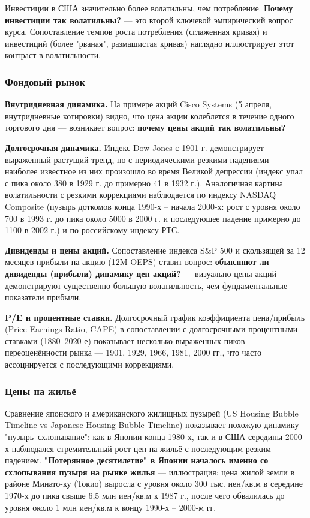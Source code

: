 \documentclass[10pt,a4paper]{article}
\begin{document}
Инвестиции в США значительно более волатильны, чем потребление. \textbf{Почему инвестиции так волатильны?} — это второй ключевой эмпирический вопрос курса. Сопоставление темпов роста потребления (сглаженная кривая) и инвестиций (более "рваная", размашистая кривая) наглядно иллюстрирует этот контраст в волатильности.
 
\subsubsection{Фондовый рынок}
 
\textbf{Внутридневная динамика.} На примере акций Cisco Systems (5 апреля, внутридневные котировки) видно, что цена акции колеблется в течение одного торгового дня — возникает вопрос: \textbf{почему цены акций так волатильны?}
 
\textbf{Долгосрочная динамика.} Индекс Dow Jones с 1901 г. демонстрирует выраженный растущий тренд, но с периодическими резкими падениями — наиболее известное из них произошло во время Великой депрессии (индекс упал с пика около 380 в 1929 г. до примерно 41 в 1932 г.). Аналогичная картина волатильности с резкими коррекциями наблюдается по индексу NASDAQ Composite (пузырь доткомов конца 1990-х -- начала 2000-х: рост с уровня около 700 в 1993 г. до пика около 5000 в 2000 г. и последующее падение примерно до 1100 в 2002 г.) и по российскому индексу РТС.
 
\textbf{Дивиденды и цены акций.} Сопоставление индекса S\&P 500 и скользящей за 12 месяцев прибыли на акцию (12M OEPS) ставит вопрос: \textbf{объясняют ли дивиденды (прибыли) динамику цен акций?} — визуально цены акций демонстрируют существенно большую волатильность, чем фундаментальные показатели прибыли.
 
\textbf{P/E и процентные ставки.} Долгосрочный график коэффициента цена/прибыль (Price-Earnings Ratio, CAPE) в сопоставлении с долгосрочными процентными ставками (1880--2020-е) показывает несколько выраженных пиков переоценённости рынка — 1901, 1929, 1966, 1981, 2000 гг., что часто ассоциируется с последующими коррекциями.
 
\subsubsection{Цены на жильё}
 
Сравнение японского и американского жилищных пузырей (US Housing Bubble Timeline vs Japanese Housing Bubble Timeline) показывает похожую динамику "пузырь--схлопывание": как в Японии конца 1980-х, так и в США середины 2000-х наблюдался стремительный рост цен на жильё с последующим резким падением. \textbf{"Потерянное десятилетие" в Японии началось именно со схлопывания пузыря на рынке жилья} — иллюстрация: цена жилой земли в районе Минато-ку (Токио) выросла с уровня около 300 тыс. иен/кв.м в середине 1970-х до пика свыше 6,5 млн иен/кв.м к 1987 г., после чего обвалилась до уровня около 1 млн иен/кв.м к концу 1990-х -- 2000-м гг.
 
\end{document}
